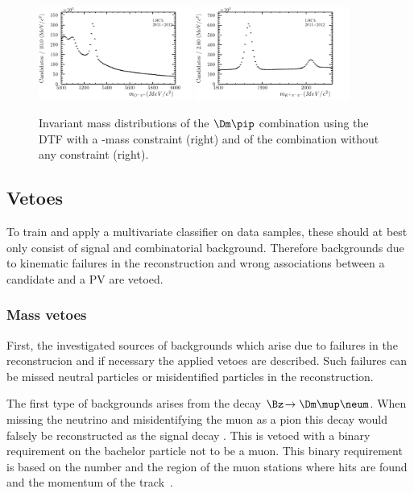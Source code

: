 \begin{figure}[tbp]
    \centering
    \includegraphics[width=0.45\textwidth]{06selection/figs/Bmass_afterStrippingAndTrigger.pdf}
    \includegraphics[width=0.45\textwidth]{06selection/figs/Dmass_afterStrippingAndTrigger.pdf}
    \caption{Invariant mass distributions of the $\Dm\pip$ combination using the DTF with a \Dm-mass constraint (right) and of the \Kp\pim\pim combination without any constraint (right).}
    \label{fig:BAndDmassAfterStripping}
\end{figure}

\subsection{Vetoes}
\label{sec:vetoes}

To train and apply a multivariate classifier on data samples, these should at best only consist of signal and combinatorial background.
Therefore backgrounds due to kinematic failures in the reconstruction and wrong associations between a \Bz candidate and a \ac{PV} are vetoed.

\subsubsection*{Mass vetoes}

First, the investigated sources of backgrounds which arise due to failures in the reconstrucion and if necessary the applied vetoes are described.
Such failures can be missed neutral particles or misidentified particles in the reconstruction.

The first type of backgrounds arises from the decay $\Bz\!\to\Dm\mup\neum$. When missing the neutrino and misidentifying the muon as a pion this decay would falsely be reconstructed as the signal decay \BdToDpi.
This is vetoed with a binary requirement on the bachelor particle not to be a muon.
This binary requirement is based on the number and the region of the muon stations where hits are found and the momentum of the track~\cite{Archilli:2013npa}.

